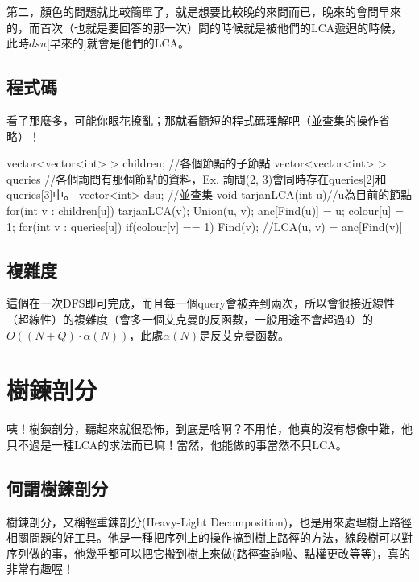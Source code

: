\documentclass[main.tex]{subfiles}
\begin{document}
		第二，顏色的問題就比較簡單了，就是想要比較晚的來問而已，晚來的會問早來的，而首次（也就是要回答的那一次）問的時候就是被他們的LCA遞迴的時候，此時$dsu[$早來的$]$就會是他們的LCA。
		\subsection{程式碼}
			看了那麼多，可能你眼花撩亂；那就看簡短的程式碼理解吧（並查集的操作省略）！
		\begin{C++}
vector<vector<int> > children; //各個節點的子節點
vector<vector<int> > queries //各個詢問有那個節點的資料，Ex. 詢問(2, 3)會同時存在queries[2]和queries[3]中。
vector<int> dsu; //並查集
void tarjanLCA(int u){//u為目前的節點
	for(int v : children[u]){
		tarjanLCA(v);
		Union(u, v);
		anc[Find(u)] = u;
	}
	colour[u] = 1;
	for(int v : queries[u]){
		if(colour[v] == 1){
			Find(v);
			//LCA(u, v) = anc[Find(v)]
		}
	}
}
		\end{C++}
	\subsection{複雜度}
		這個在一次DFS即可完成，而且每一個query會被弄到兩次，所以會很接近線性（超線性）的複雜度（會多一個艾克曼的反函數，一般用途不會超過$4$）的$O((N + Q) \cdot \alpha(N))$，此處$\alpha(N)$是反艾克曼函數。
	\section{樹鍊剖分}
	
	咦！樹鍊剖分，聽起來就很恐怖，到底是啥啊？不用怕，他真的沒有想像中難，他只不過是一種LCA的求法而已嘛！當然，他能做的事當然不只LCA。
	\subsection{何謂樹鍊剖分}
	樹鍊剖分，又稱輕重鍊剖分(Heavy-Light Decomposition)，也是用來處理樹上路徑相關問題的好工具。他是一種把序列上的操作搞到樹上路徑的方法，線段樹可以對序列做的事，他幾乎都可以把它搬到樹上來做(路徑查詢啦、點權更改等等)，真的非常有趣喔！
		
\end{document}
